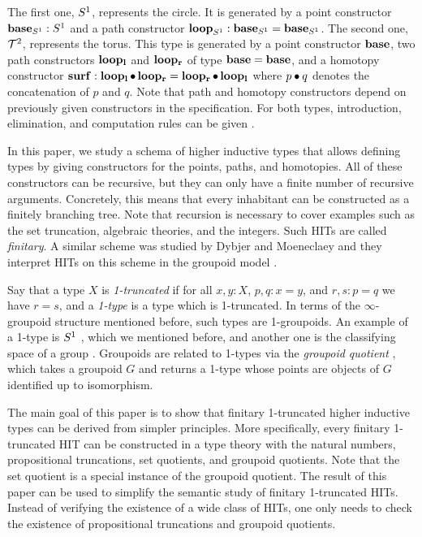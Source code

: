 The first one, $S^1$, represents the circle.
It is generated by a point constructor $\operatorname{\mathbf{base}}_{S^1} : S^1$ and a path constructor $\operatorname{\mathbf{loop}}_{S^1} : \operatorname{\mathbf{base}}_{S^1} = \operatorname{\mathbf{base}}_{S^1}$.
The second one, $\mathcal{T}^2$, represents the torus.
This type is generated by a point constructor $\operatorname{\mathbf{base}}$, two path constructors $\operatorname{\mathbf{loop_l}}$ and $\operatorname{\mathbf{loop_r}}$ of type $\operatorname{\mathbf{base}} = \operatorname{\mathbf{base}}$,
and a homotopy constructor $\operatorname{\mathbf{surf}} : \operatorname{\mathbf{loop_l}} \bullet \operatorname{\mathbf{loop_r}} = \operatorname{\mathbf{loop_r}} \bullet \operatorname{\mathbf{loop_l}}$
where $p \bullet q$ denotes the concatenation of $p$ and $q$.
Note that path and homotopy constructors depend on previously given constructors in the specification.
For both types, introduction, elimination, and computation rules can be given \cite{hottbook}.

In this paper, we study a schema of higher inductive types that allows defining types by
giving constructors for the points, paths, and homotopies.
All of these constructors can be recursive, but they can only have a finite number of recursive arguments.
Concretely, this means that every inhabitant can be constructed as a finitely branching tree.
Note that recursion is necessary to cover examples such as the set truncation, algebraic theories, and the integers.
Such HITs are called \emph{finitary}.
A similar scheme was studied by Dybjer and Moeneclaey
and they interpret HITs on this scheme in the groupoid model \cite{DBLP:journals/entcs/DybjerM18}.

Say that a type $X$ is \emph{1-truncated} if for all $x, y : X$, $p, q : x = y$, and $r, s : p = q$ we have $r = s$,
and a \emph{1-type} is a type which is 1-truncated.
In terms of the $\infty$-groupoid structure mentioned before, such types are 1-groupoids.
An example of a 1-type is $S^1$ \cite{LicataS13}, which we mentioned before,
and another one is the classifying space of a group \cite{LicataF14}.
Groupoids are related to 1-types via the \emph{groupoid quotient} \cite{sojakovaPhD},
which takes a groupoid $G$ and returns a 1-type
whose points are objects of $G$ identified up to isomorphism.

The main goal of this paper is to show that finitary 1-truncated higher inductive types can be derived from simpler principles.
More specifically, every finitary 1-truncated HIT can be constructed in a type theory
with the natural numbers, propositional truncations, set quotients, and groupoid quotients.
Note that the set quotient is a special instance of the groupoid quotient.
The result of this paper can be used to simplify the semantic study of finitary 1-truncated HITs.
Instead of verifying the existence of a wide class of HITs, one only needs to check the existence
of propositional truncations and groupoid quotients.


